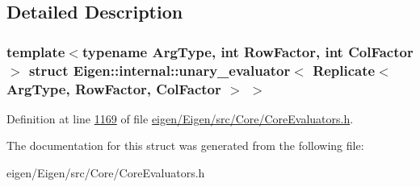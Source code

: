 \subsection{Detailed Description}
\subsubsection*{template$<$typename Arg\+Type, int Row\+Factor, int Col\+Factor$>$\newline
struct Eigen\+::internal\+::unary\+\_\+evaluator$<$ Replicate$<$ Arg\+Type, Row\+Factor, Col\+Factor $>$ $>$}



Definition at line \hyperlink{eigen_2_eigen_2src_2_core_2_core_evaluators_8h_source_l01169}{1169} of file \hyperlink{eigen_2_eigen_2src_2_core_2_core_evaluators_8h_source}{eigen/\+Eigen/src/\+Core/\+Core\+Evaluators.\+h}.



The documentation for this struct was generated from the following file\+:\begin{DoxyCompactItemize}
\item 
eigen/\+Eigen/src/\+Core/\+Core\+Evaluators.\+h\end{DoxyCompactItemize}
